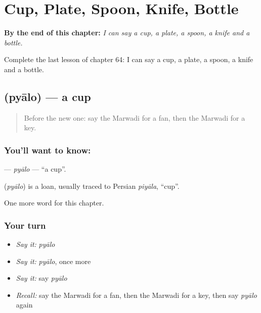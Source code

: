 
\chapter{Cup, Plate, Spoon, Knife, Bottle}
\label{ch:mw-cup-plate-spoon-knife-bottle}

\begin{chapteropening}
\textbf{By the end of this chapter:} \emph{I can say a cup, a plate, a spoon, a knife and a bottle.}

Complete the last lesson of chapter 64: I can say a cup, a plate, a spoon, a knife and a bottle.
\end{chapteropening}

\section[\texorpdfstring{\mw{प्यालो} (pyālo)}{प्यालो (pyālo)}]{ (pyālo) — a cup}

\label{lesson:MW-C64-pyalo}



\begin{quote}
Before the new one: say the Marwadi for a fan, then the Marwadi for a key.
\end{quote}

\subsection*{You'll want to know: }
\textbf{} — \emph{pyālo} — \textquotedblleft{}a cup\textquotedblright{}.

\begin{cousinweb}
\textbf{} (\emph{pyālo}) is a loan, usually traced to Persian \emph{piyāla}, \textquotedblleft{}cup\textquotedblright{}.
\end{cousinweb}

\begin{grammarlens}[title={What you've built}]
One more word for this chapter.
\end{grammarlens}

\subsection*{Your turn}
\begin{itemize}
\raggedright
  \item \emph{Say it:} \emph{pyālo}
  \item \emph{Say it:} \emph{pyālo}, once more
  \item \emph{Say it:} say \emph{pyālo}
  \item \emph{Recall:} say the Marwadi for a fan, then the Marwadi for a key, then say \emph{pyālo} again
\end{itemize}

